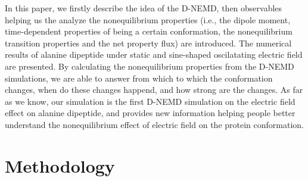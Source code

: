 \documentclass[aip,jcp,a4paper,preprint,onecolumn]{revtex4-1}
\begin{document}
In this paper, we firstly describe the idea of the D-NEMD, then
observables helping us the analyze the nonequilibrium properties
(i.e., the dipole moment, time-dependent properties of being a certain
conformation, the nonequilibrium transition properties and the net
property flux) are introduced. The numerical results of alanine
dipeptide under static and sine-shaped oscilatating electric field are
presented. By calculating the nonequilibrium properties from the D-NEMD
simulations, we are able to answer from which to which the conformation
changes, when do these changes happend, and how strong are the changes.
As far as we know, our simulation is the first D-NEMD simulation
on the electric field effect on alanine dipeptide, and provides new
information helping people better understand the nonequilibrium
effect of electric field on the protein conformation.



\section{Methodology}
\end{document}
